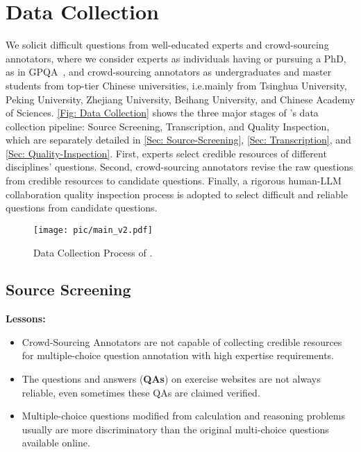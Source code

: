 \section{Data Collection}\label{sec:data_collection}
We solicit difficult questions from well-educated experts and crowd-sourcing annotators, where we consider experts as individuals having or pursuing a PhD, as in GPQA~\citep{rein2023gpqa}, and crowd-sourcing annotators as undergraduates and master students from top-tier Chinese universities, i.e.mainly from Tsinghua University, Peking University, Zhejiang University, Beihang University, and Chinese Academy of Sciences.
\autoref{Fig: Data Collection} shows the three major stages of \benchmark's data collection pipeline: Source Screening, Transcription, and Quality Inspection, which are separately detailed in \autoref{Sec: Source-Screening}, \autoref{Sec: Transcription}, and \autoref{Sec: Quality-Inspection}.
First, experts select credible resources of different
disciplines’ questions.
Second, crowd-sourcing annotators revise the raw questions from credible resources to candidate questions.
Finally, a rigorous human-LLM collaboration quality inspection process is adopted to select difficult and reliable questions from candidate questions.

\begin{figure*}[ht]
\begin{center}
\texttt{[image: pic/main\_v2.pdf]}
\end{center}
\caption{Data Collection Process of \benchmark.}
\label{Fig: Data Collection}
\end{figure*}

\subsection{Source Screening}
\label{Sec: Source-Screening}

\begin{tcolorbox}[colframe=boxcolor,colback=white,boxrule=0.5mm,arc=0mm]
{\Large \textcolor{bulbcolor}{\faLightbulbO}}  \textbf{Lessons:}
\begin{itemize}
    \item Crowd-Sourcing Annotators are not capable of collecting credible resources for multiple-choice question annotation with high expertise requirements.
    \item The questions and answers (\textbf{QAs}) on exercise websites are not always reliable, even sometimes these QAs are claimed verified.
    \item Multiple-choice questions modified from calculation and reasoning problems usually are more discriminatory than the original multi-choice questions available online.
\end{itemize}
\end{tcolorbox}


